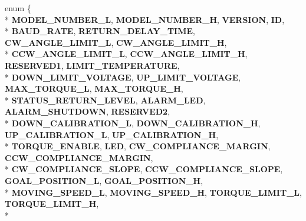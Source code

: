 \begin{DoxyCompactItemize}
\item 
enum \{ \\*
{\bfseries M\+O\+D\+E\+L\+\_\+\+N\+U\+M\+B\+E\+R\+\_\+L}, 
{\bfseries M\+O\+D\+E\+L\+\_\+\+N\+U\+M\+B\+E\+R\+\_\+H}, 
{\bfseries V\+E\+R\+S\+I\+ON}, 
{\bfseries ID}, 
\\*
{\bfseries B\+A\+U\+D\+\_\+\+R\+A\+TE}, 
{\bfseries R\+E\+T\+U\+R\+N\+\_\+\+D\+E\+L\+A\+Y\+\_\+\+T\+I\+ME}, 
{\bfseries C\+W\+\_\+\+A\+N\+G\+L\+E\+\_\+\+L\+I\+M\+I\+T\+\_\+L}, 
{\bfseries C\+W\+\_\+\+A\+N\+G\+L\+E\+\_\+\+L\+I\+M\+I\+T\+\_\+H}, 
\\*
{\bfseries C\+C\+W\+\_\+\+A\+N\+G\+L\+E\+\_\+\+L\+I\+M\+I\+T\+\_\+L}, 
{\bfseries C\+C\+W\+\_\+\+A\+N\+G\+L\+E\+\_\+\+L\+I\+M\+I\+T\+\_\+H}, 
{\bfseries R\+E\+S\+E\+R\+V\+E\+D1}, 
{\bfseries L\+I\+M\+I\+T\+\_\+\+T\+E\+M\+P\+E\+R\+A\+T\+U\+RE}, 
\\*
{\bfseries D\+O\+W\+N\+\_\+\+L\+I\+M\+I\+T\+\_\+\+V\+O\+L\+T\+A\+GE}, 
{\bfseries U\+P\+\_\+\+L\+I\+M\+I\+T\+\_\+\+V\+O\+L\+T\+A\+GE}, 
{\bfseries M\+A\+X\+\_\+\+T\+O\+R\+Q\+U\+E\+\_\+L}, 
{\bfseries M\+A\+X\+\_\+\+T\+O\+R\+Q\+U\+E\+\_\+H}, 
\\*
{\bfseries S\+T\+A\+T\+U\+S\+\_\+\+R\+E\+T\+U\+R\+N\+\_\+\+L\+E\+V\+EL}, 
{\bfseries A\+L\+A\+R\+M\+\_\+\+L\+ED}, 
{\bfseries A\+L\+A\+R\+M\+\_\+\+S\+H\+U\+T\+D\+O\+WN}, 
{\bfseries R\+E\+S\+E\+R\+V\+E\+D2}, 
\\*
{\bfseries D\+O\+W\+N\+\_\+\+C\+A\+L\+I\+B\+R\+A\+T\+I\+O\+N\+\_\+L}, 
{\bfseries D\+O\+W\+N\+\_\+\+C\+A\+L\+I\+B\+R\+A\+T\+I\+O\+N\+\_\+H}, 
{\bfseries U\+P\+\_\+\+C\+A\+L\+I\+B\+R\+A\+T\+I\+O\+N\+\_\+L}, 
{\bfseries U\+P\+\_\+\+C\+A\+L\+I\+B\+R\+A\+T\+I\+O\+N\+\_\+H}, 
\\*
{\bfseries T\+O\+R\+Q\+U\+E\+\_\+\+E\+N\+A\+B\+LE}, 
{\bfseries L\+ED}, 
{\bfseries C\+W\+\_\+\+C\+O\+M\+P\+L\+I\+A\+N\+C\+E\+\_\+\+M\+A\+R\+G\+IN}, 
{\bfseries C\+C\+W\+\_\+\+C\+O\+M\+P\+L\+I\+A\+N\+C\+E\+\_\+\+M\+A\+R\+G\+IN}, 
\\*
{\bfseries C\+W\+\_\+\+C\+O\+M\+P\+L\+I\+A\+N\+C\+E\+\_\+\+S\+L\+O\+PE}, 
{\bfseries C\+C\+W\+\_\+\+C\+O\+M\+P\+L\+I\+A\+N\+C\+E\+\_\+\+S\+L\+O\+PE}, 
{\bfseries G\+O\+A\+L\+\_\+\+P\+O\+S\+I\+T\+I\+O\+N\+\_\+L}, 
{\bfseries G\+O\+A\+L\+\_\+\+P\+O\+S\+I\+T\+I\+O\+N\+\_\+H}, 
\\*
{\bfseries M\+O\+V\+I\+N\+G\+\_\+\+S\+P\+E\+E\+D\+\_\+L}, 
{\bfseries M\+O\+V\+I\+N\+G\+\_\+\+S\+P\+E\+E\+D\+\_\+H}, 
{\bfseries T\+O\+R\+Q\+U\+E\+\_\+\+L\+I\+M\+I\+T\+\_\+L}, 
{\bfseries T\+O\+R\+Q\+U\+E\+\_\+\+L\+I\+M\+I\+T\+\_\+H}, 
\\*

\end{DoxyCompactItemize}
